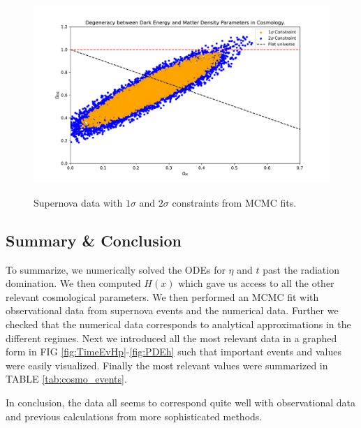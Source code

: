 \documentclass[%
reprint,
 amsmath,amssymb,
 aps,
]{revtex4-2}
\begin{document}
\begin{figure}[ht!]
\caption{Supernova data with $1\sigma$ and $2\sigma$ constraints from MCMC fits.}
\includegraphics[width = \linewidth]{Figures/ScattPlot.pdf}
\label{fig:scatt}
\end{figure}





\subsection{Summary \& Conclusion}

To summarize, we numerically solved the ODEs for $\eta$ and $t$ past the radiation domination. We then computed $H(x)$ which gave us access to all the other relevant cosmological parameters. We then performed an MCMC fit with observational data from supernova events and the numerical data. Further we checked that the numerical data corresponds to analytical approximations in the different regimes. Next we introduced all the most relevant data in a graphed form in FIG \ref{fig:TimeEvHp}-\ref{fig:PDEh} such that important events and values were easily visualized. Finally the most relevant values were summarized in TABLE \ref{tab:cosmo_events}.

In conclusion, the data all seems to correspond quite well with observational data and previous calculations from more sophisticated methods.
\end{document}

